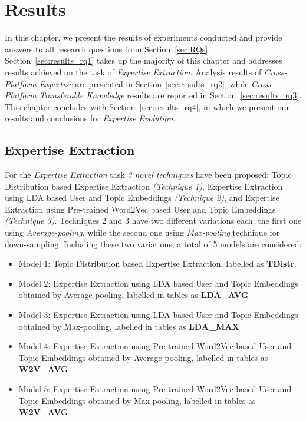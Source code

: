 \chapter{Results\label{chap:result}}

    In this chapter, we present the results of experiments conducted and provide answers to all research questions from Section~\ref{sec:RQs}. Section~\ref{sec:results_rq1} takes up the majority of this chapter and addresses results achieved on the task of \emph{Expertise Extraction}. Analysis results of \emph{Cross-Platform Expertise} are presented in Section~\ref{sec:results_rq2}, while \emph{Cross-Platform Transferable Knowledge} results are reported in Section~\ref{sec:results_rq3}. This chapter concludes with Section~\ref{sec:results_rq4}, in which we present our results and conclusions for \emph{Expertise Evolution}.

    \section{Expertise Extraction\label{sec:results_rq1}}
        
        For the \emph{Expertise Extraction} task \emph{3 novel techniques} have been proposed: Topic Distribution based Expertise Extraction \emph{(Technique 1)}, Expertise Extraction using LDA based User and Topic Embeddings \emph{(Technique 2)}, and Expertise Extraction using Pre-trained Word2Vec based User and Topic Embeddings \emph{(Technique 3)}. Techniques 2 and 3 have two different variations each: the first one using \emph{Average-pooling}, while the second one using \emph{Max-pooling} technique for down-sampling. Including these two variations, a total of 5 models are considered:
        
        \begin{itemize}
            \item Model 1: Topic Distribution based Expertise Extraction, labelled as \textbf{TDistr}
            \item Model 2: Expertise Extraction using LDA based User and Topic Embeddings obtained by Average-pooling, labelled in tables as \textbf{LDA\_AVG}
            \item Model 3: Expertise Extraction using LDA based User and Topic Embeddings obtained by Max-pooling, labelled in tables as \textbf{LDA\_MAX}
            \item Model 4: Expertise Extraction using Pre-trained Word2Vec based User and Topic Embeddings obtained by Average-pooling, labelled in tables as \textbf{W2V\_AVG} 
            \item Model 5: Expertise Extraction using Pre-trained Word2Vec based User and Topic Embeddings obtained by Max-pooling, labelled in tables as \textbf{W2V\_AVG} 
        \end{itemize}
        
